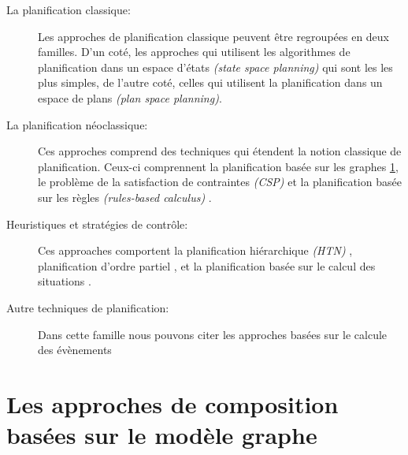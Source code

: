   \renewcommand{\descriptionlabel}[1]{\hspace{0.5cm}\textbullet~\textsf{#1}}
  \begin{description}
  \item [La planification classique: ] Les approches de planification
    classique \cite{akkiraju2004executing, zeng2008dynamic} peuvent
    être regroupées en deux familles. D'un coté, les approches qui
    utilisent les algorithmes de planification dans un espace d'états
    \textit{(state space planning)} qui sont les les plus simples, de
    l'autre coté, celles qui utilisent la planification dans un espace
    de plans \textit{(plan space planning)}.

  \item [La planification néoclassique:] Ces approches comprend des
    techniques qui étendent la notion classique de
    planification. Ceux-ci comprennent la planification basée sur les
    graphes \ref{sec:graph-base-composition}, le problème de la
    satisfaction de contraintes \textit{(CSP)}
    \cite{paik2007automatic} et la planification basée sur les règles
    \textit{(rules-based calculus)} \cite{medjahed2004semantic,
      rao2006mixed}.

  \item [Heuristiques et stratégies de contrôle:] Ces approaches
    comportent la planification hiérarchique \textit{(HTN)}
    \cite{mcilraith2002adapting, sohrabi2009optimizing,
      sohrabi2009web}, planification d'ordre partiel
    \cite{peer2005pop, klusch2005semantic}, et la planification basée
    sur le calcul des situations \cite{phan2006automatic}.


  \item [Autre techniques de
    planification\cite{pistore2004planning,pistore2005automated,
      pistore2005automated2, aydin2008automated}:] Dans cette famille
    nous pouvons citer les approches basées sur le calcule des
    évènements
  \end{description}
  \enddescription

\section{Les approches de composition basées sur le modèle graphe}
\label{sec:graph-base-composition}
  \newpage
